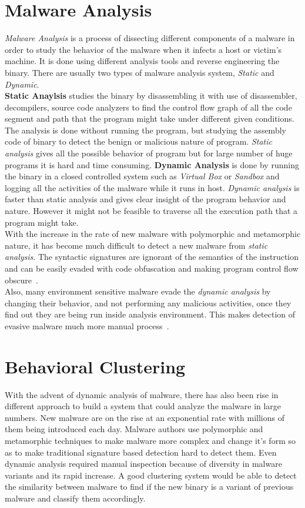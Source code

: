 \section{Malware Analysis}
\label{sec:Malware Analysis}
\emph{Malware Analysis} is a process of dissecting different components of a malware in order to study the behavior of the malware when it infects a host or victim's machine. It is done using different analysis tools and reverse engineering the binary.
There are usually two types of malware analysis system, \emph{Static} and \emph{Dynamic}.\\
\textbf{Static Anaylsis} studies the binary by disassembling it with use of disassembler, decompilers, source code analyzers to find the control flow graph of all the code segment and path that the program might take under different given conditions.
The analysis is done without running the program, but studying the assembly code of binary to detect the benign or malicious nature of program.
\emph{Static analysis} gives all the possible behavior of program but for large number of huge programs it is hard and time consuming.
\textbf{Dynamic Analysis} is done by running the binary in a closed controlled system such as \emph{Virtual Box} or \emph{Sandbox} and logging all the activities of the malware while it runs in host.
\emph{Dynamic analysis} is faster than static analysis and gives clear insight of the program behavior and nature.
However it might not be feasible to traverse all the execution path that a program might take.
\\
With the increase in the rate of new malware with polymorphic and metamorphic nature, it has become much difficult to detect a new malware from \emph{static analysis}.
The syntactic signatures are ignorant of the semantics of the instruction and can be easily evaded with code obfuscation and making program control flow obscure~\cite[]{staticlimit}.\\
Also, many environment sensitive malware evade the \emph{dynamic analysis} by changing their behavior, and not performing any malicious activities, once they find out they are being run inside analysis environment.
This makes detection of evasive malware much more manual process~\cite[]{barecloud}.

\section{Behavioral Clustering}
\label{sec:Behavioral Clustering}
With the advent of dynamic analysis of malware, there has also been rise in different approach to build a system that could analyze the malware in large numbers.
New malware are on the rise at an exponential rate with millions of them being introduced each day.
Malware authors use polymorphic and metamorphic techniques to make malware more complex and change it's form so as to make traditional signature based detection hard to detect them.
Even dynamic analysis required manual inspection because of diversity in malware variants and its rapid increase.
A good clustering system would be able to detect the similarity between malware to find if the new binary is a variant of previous malware and classify them accordingly.
